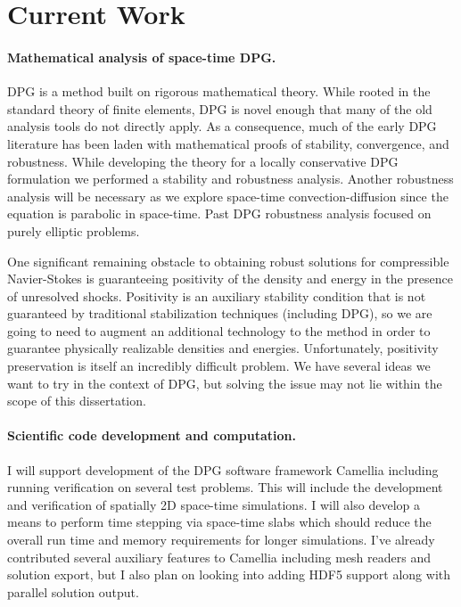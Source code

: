 \documentclass[letterpaper,12pt]{article}
\begin{document}
\section*{Current Work}
\paragraph{Mathematical analysis of space-time DPG.}
DPG is a method built on rigorous mathematical theory.
While rooted in the standard theory of finite elements, DPG is novel enough that many of the old analysis tools do not directly apply.
As a consequence, much of the early DPG literature has been laden with mathematical proofs of stability, convergence, and robustness.
While developing the theory for a locally conservative DPG formulation we performed a stability and robustness analysis.
Another robustness analysis will be necessary as we explore space-time convection-diffusion since the equation is parabolic in space-time.
Past DPG robustness analysis focused on purely elliptic problems.

One significant remaining obstacle to obtaining robust solutions for compressible Navier-Stokes is guaranteeing positivity of the density and
energy in the presence of unresolved shocks. 
Positivity is an auxiliary stability condition that is not guaranteed by traditional stabilization 
techniques (including DPG), so we are going to need to augment an additional technology to the method in order to guarantee physically
realizable densities and energies. 
Unfortunately, positivity preservation is itself an incredibly difficult problem. 
We have several ideas we want to try in the context of DPG, but solving the issue may not lie within the scope of this dissertation.

\paragraph{Scientific code development and computation.}
I will support development of the DPG software framework Camellia \cite{Roberts2011} including running verification on several test problems.
This will include the development and verification of spatially 2D space-time simulations.
I will also develop a means to perform time stepping via space-time slabs which should reduce the 
overall run time and memory requirements for longer simulations.
I've already contributed several auxiliary features to Camellia including mesh readers and solution export, 
but I also plan on looking into adding HDF5 support along with parallel solution output.
\end{document}

